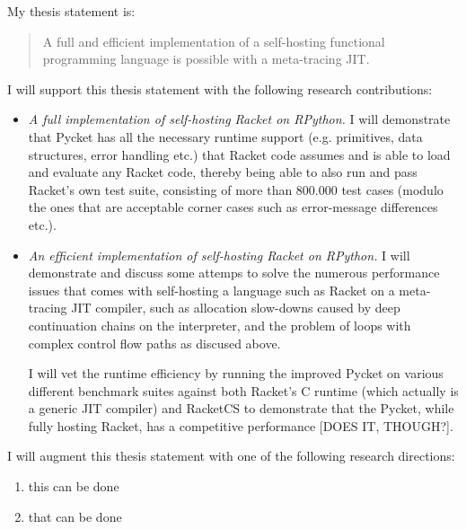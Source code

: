My thesis statement is:

\begin{quote}
  A full and efficient implementation of a self-hosting functional
  programming language is possible with a meta-tracing JIT.
\end{quote}

I will support this thesis statement with the following research
contributions:

\begin{itemize}
  \item \textit{A full implementation of self-hosting Racket on
    RPython.} I will demonstrate that Pycket has all the necessary
    runtime support (e.g. primitives, data structures, error handling
    etc.)  that Racket code assumes and is able to load and evaluate
    any Racket code, thereby being able to also run and pass Racket's
    own test suite, consisting of more than 800.000 test cases (modulo
    the ones that are acceptable corner cases such as error-message
    differences etc.).
  \item \textit{An efficient implementation of self-hosting Racket on
    RPython.} I will demonstrate and discuss some attemps to solve the
    numerous performance issues that comes with self-hosting a
    language such as Racket on a meta-tracing JIT compiler, such as
    allocation slow-downs caused by deep continuation chains on the
    interpreter, and the problem of loops with complex control flow
    paths as discused above.


    I will vet the runtime efficiency by running the improved Pycket
    on various different benchmark suites against both Racket's C
    runtime (which actually is a generic JIT compiler) and RacketCS to
    demonstrate that the Pycket, while fully hosting Racket, has a
    competitive performance [DOES IT, THOUGH?].
\end{itemize}

I will augment this thesis statement with one of the following research directions:

\begin{enumerate}
  \item this can be done
  \item that can be done
\end{enumerate}
